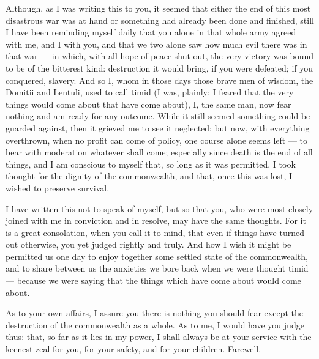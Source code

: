 

 Although, as I was writing this to you, it seemed that either the end of this most disastrous war was at hand or something had already been done and finished, still I have been reminding myself daily that you alone in that whole army agreed with me, and I with you, and that we two alone saw how much evil there was in that war --- in which, with all hope of peace shut out, the very victory was bound to be of the bitterest kind: destruction it would bring, if you were defeated; if you conquered, slavery. And so I, whom in those days those brave men of wisdom, the Domitii and Lentuli, used to call timid (I was, plainly: I feared that the very things would come about that have come about), I, the same man, now fear nothing and am ready for any outcome. While it still seemed something could be guarded against, then it grieved me to see it neglected; but now, with everything overthrown, when no profit can come of policy, one course alone seems left --- to bear with moderation whatever shall come; especially since death is the end of all things, and I am conscious to myself that, so long as it was permitted, I took thought for the dignity of the commonwealth, and that, once this was lost, I wished to preserve survival.

 I have written this not to speak of myself, but so that you, who were most closely joined with me in conviction and in resolve, may have the same thoughts. For it is a great consolation, when you call it to mind, that even if things have turned out otherwise, you yet judged rightly and truly. And how I wish it might be permitted us one day to enjoy together some settled state of the commonwealth, and to share between us the anxieties we bore back when we were thought timid --- because we were saying that the things which have come about would come about.

 As to your own affairs, I assure you there is nothing you should fear except the destruction of the commonwealth as a whole. As to me, I would have you judge thus: that, so far as it lies in my power, I shall always be at your service with the keenest zeal for you, for your safety, and for your children. Farewell.
